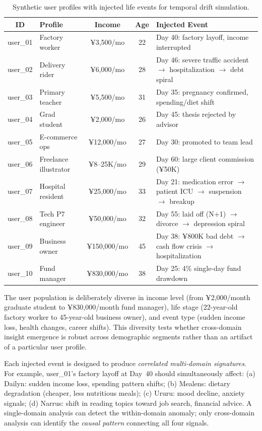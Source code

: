 \documentclass[11pt,a4paper]{article}
\newcommand{\yen}{¥}
\newcommand{\appname}[1]{\textsf{#1}}
\begin{document}
\begin{table}[H]
\centering
\caption{Synthetic user profiles with injected life events for temporal drift simulation.}
\label{tab:users}
\small
\begin{tabular}{@{}clccp{5.5cm}@{}}
\toprule
\textbf{ID} & \textbf{Profile} & \textbf{Income} & \textbf{Age} & \textbf{Injected Event} \\
\midrule
user\_01 & Factory worker     & \yen 3,500/mo  & 22 & Day 40: factory layoff, income interrupted \\
user\_02 & Delivery rider     & \yen 6,000/mo  & 28 & Day 46: severe traffic accident $\to$ hospitalization $\to$ debt spiral \\
user\_03 & Primary teacher    & \yen 5,500/mo  & 31 & Day 35: pregnancy confirmed, spending/diet shift \\
user\_04 & Grad student       & \yen 2,000/mo  & 26 & Day 45: thesis rejected by advisor \\
user\_05 & E-commerce ops     & \yen 12,000/mo & 27 & Day 30: promoted to team lead \\
user\_06 & Freelance illustrator & \yen 8--25K/mo & 29 & Day 60: large client commission (\yen 50K) \\
user\_07 & Hospital resident  & \yen 25,000/mo & 33 & Day 21: medication error $\to$ patient ICU $\to$ suspension $\to$ breakup \\
user\_08 & Tech P7 engineer   & \yen 50,000/mo & 32 & Day 55: laid off (N+1) $\to$ divorce $\to$ depression spiral \\
user\_09 & Business owner & \yen 150,000/mo & 45 & Day 38: \yen 800K bad debt $\to$ cash flow crisis $\to$ hospitalization \\
user\_10 & Fund manager       & \yen 830,000/mo & 38 & Day 25: 4\% single-day fund drawdown \\
\bottomrule
\end{tabular}
\end{table}

The user population is deliberately diverse in income level (from
\yen 2,000/month graduate student to \yen 830,000/month fund manager), life
stage (22-year-old factory worker to 45-year-old business owner), and event
type (sudden income loss, health changes, career shifts). This diversity tests
whether cross-domain insight emergence is robust across demographic segments
rather than an artifact of a particular user profile.

Each injected event is designed to produce \emph{correlated multi-domain
signatures}. For example, user\_01's factory layoff at Day~40 should
simultaneously affect: (a) \appname{Dailyn}: sudden income loss, spending
pattern shifts; (b) \appname{Mealens}: dietary degradation (cheaper,
less nutritious meals); (c) \appname{Ururu}: mood decline, anxiety signals;
(d) \appname{Narrus}: shift in reading topics toward job search, financial
advice. A single-domain analysis can detect the within-domain anomaly; only
cross-domain analysis can identify the \emph{causal pattern} connecting all
four signals.
\end{document}
